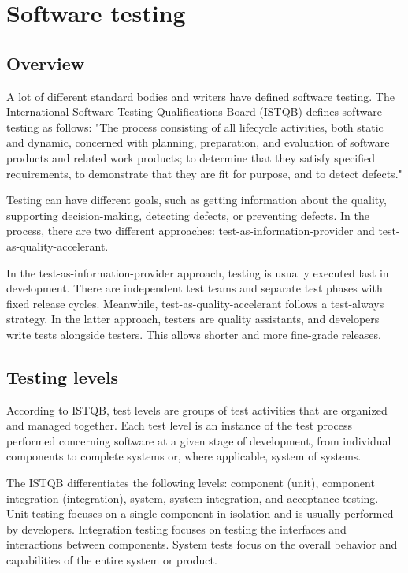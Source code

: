 \chapter{Software testing}
\label{chap:testing}
\section{Overview}
A lot of different standard bodies and writers have defined software testing.
The International Software Testing Qualifications Board (ISTQB) defines software testing
as follows: "The process consisting of all lifecycle activities, both static and
dynamic, concerned with planning, preparation, and evaluation of software products and
related work products; to determine that they satisfy specified requirements,
to demonstrate that they are fit for purpose, and to detect defects." \cite{ctfl_syllabus:2023}

Testing can have different goals, such as getting information about the quality,
supporting decision-making, detecting defects, or preventing defects.
In the process, there are two different approaches: test-as-information-provider
and test-as-quality-accelerant.

In the test-as-information-provider approach, testing is usually executed last in development.
There are independent test teams and separate test phases with fixed release cycles.
Meanwhile, test-as-quality-accelerant follows a test-always strategy.
In the latter approach, testers are quality assistants, and developers
write tests alongside testers.
This allows shorter and more fine-grade releases.
\section{Testing levels}

According to ISTQB, test levels are groups of test activities that are organized
and managed together.
Each test level is an instance of the test process performed concerning
software at a given stage of development, from individual components to complete
systems or, where applicable, system of systems. \cite{ctfl_syllabus:2023}

The ISTQB differentiates the following levels: component (unit), component integration (integration), system, system integration, and acceptance testing. Unit testing focuses on a single component in isolation and is usually performed by developers. Integration testing focuses on testing the interfaces and interactions between components. System tests focus on the overall behavior and capabilities of the entire system or product.

